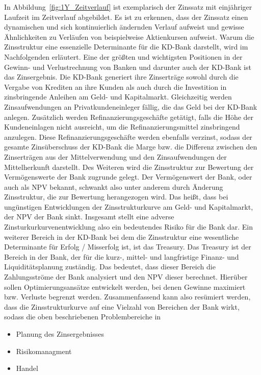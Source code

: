 In Abbildung~\ref{fig:1Y_Zeitverlauf} ist exemplarisch der Zinssatz mit einjähriger Laufzeit im Zeitverlauf abgebildet.
Es ist zu erkennen, dass der Zinssatz einen dynamischen und sich kontinuierlich ändernden Verlauf aufweist und
gewisse Ähnlichkeiten zu Verläufen von beispielweise Aktienkursen aufweist.
Warum die Zinsstruktur eine essenzielle Determinante für die \ac{KD-Bank} darstellt, wird im Nachfolgenden erläutert.
Eine der größten und wichtigsten Positionen in der Gewinn- und Verlustrechnung von Banken und darunter auch der \ac{KD-Bank}
ist das Zinsergebnis.
Die \ac{KD-Bank} generiert ihre Zinserträge sowohl durch die Vergabe von Krediten an ihre Kunden als auch durch die
Investition in zinsbringende Anleihen am Geld- und Kapitalmarkt.
Gleichzeitig werden Zinsaufwendungen an Privatkundeneinleger fällig, die das Geld bei der \ac{KD-Bank} anlegen.
Zusätzlich werden Refinanzierungsgeschäfte getätigt, falls die Höhe der Kundeneinlagen nicht ausreicht, um die
Refinanzierungsmittel zinsbringend anzulegen.
Diese Refinanzierungsgeschäfte werden ebenfalls verzinst, sodass der gesamte Zinsüberschuss der \ac{KD-Bank} die Marge bzw.
die Differenz zwischen den Zinserträgen aus der Mittelverwendung und den Zinsaufwendungen der Mittelherkunft darstellt.
\newline
Des Weiteren wird die Zinsstruktur zur Bewertung der Vermögenswerte der Bank zugrunde gelegt.
Der Vermögenswert der Bank, oder auch als \ac{NPV} bekannt, schwankt also unter anderem durch Änderung Zinsstruktur, die
zur Bewertung herangezogen wird.
Das heißt, dass bei ungünstigen Entwicklungen der Zinsstrukturkurve am Geld- und Kapitalmarkt, der \ac{NPV} der
Bank sinkt.
Insgesamt stellt eine adverse Zinsturkurkurvenentwicklung also ein bedeutendes Risiko für die Bank dar.
Ein weiterer Bereich in der \ac{KD-Bank} bei dem die Zinsstruktur eine wesentliche Determinante für Erfolg / Misserfolg ist,
ist das Treasury.
Das Treasury ist der Bereich in der Bank, der für die kurz-, mittel- und langfristige Finanz- und Liquiditätsplanung zuständig.
Das bedeutet, dass dieser Bereich die Zahlungsströme der Bank analysiert und den \ac{NPV} dieser berechnet.
Hierüber sollen Optimierungsansätze entwickelt werden, bei denen Gewinne maximiert bzw. Verluste begrenzt werden.
Zusammenfassend kann also resümiert werden, dass die Zinsstrukturkurve auf eine Vielzahl von Bereichen der Bank wirkt,
sodass die oben beschriebenen Problembereiche in
\begin{itemize}
    \item Planung des Zinsergebnisses
    \item Risikomanagment
    \item Handel
\end{itemize}

